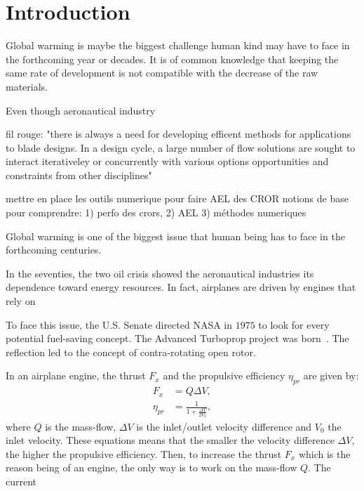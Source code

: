 
\chapter{Introduction}

Global warming is maybe the biggest challenge human kind
may have to face in the forthcoming year or decades.
It is of common knowledge that keeping the same rate 
of development is not compatible with the decrease
of the raw materials.

Even though aeronautical industry






fil rouge: "there is always a need for developing efficent methods 
  for applications to blade designs. In a design cycle, 
  a large number of flow solutions are sought to interact 
  iterativeley or concurrently with various options 
  opportunities and constraints from other disciplines"
  
mettre en place les outils numerique pour faire AEL des CROR
  notions de base pour comprendre: 1) perfo des crors, 2) AEL 
  3) méthodes numeriques



Global warming is one of the biggest issue that human being
has to face in the forthcoming centuries. 

In the seventies, the two oil crisis showed the aeronautical 
industries its dependence toward energy resources. In fact,
airplanes are driven by engines that rely on  


To face this issue, the U.S. Senate directed NASA in $1975$
to look for every potential fuel-saving concept. The Advanced Turboprop
project was born~\cite{Hager1988}. The reflection led to the
concept of contra-rotating open rotor.

In an airplane engine, 
the thrust $F_x$ and the propulsive efficiency $\eta_{pr}$ are given by:
\begin{equation}
	\begin{split}
		F_x &= Q \Delta V, \\
		\eta_{pr} &= \displaystyle \frac{1}{1 + \displaystyle \frac{\Delta V}{2 V_0}},
	\end{split}
\end{equation}
where $Q$ is the mass-flow, $\Delta V$ is the inlet/outlet velocity difference and $V_0$
the inlet velocity. These equations means that the 
smaller the velocity difference $\Delta V$, the higher the propulsive efficiency.
Then, to increase the thrust $F_x$ which is the reason being of an engine,
the only way is to work on the mass-flow $Q$.
The current

